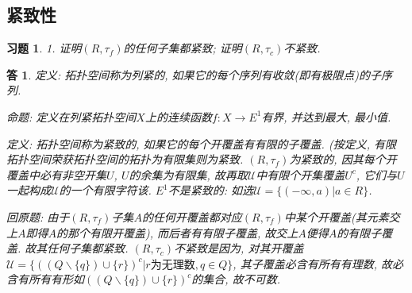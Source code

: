 \documentclass{ctexart}%
\newtheorem*{exercise}{习题}
\newtheorem*{solution}{答}
\theoremstyle{definition}
\theoremstyle{remark}
\begin{document}
\subsection{紧致性}

\begin{exercise}1. 证明$(R,\tau_f)$的任何子集都紧致; 证明$(R,\tau_c)$不紧致.
\end{exercise}
\begin{solution}
定义: 拓扑空间称为列紧的, 如果它的每个序列有收敛(即有极限点)的子序列. 

命题: 定义在列紧拓扑空间$X$上的连续函数$f: X\rightarrow E^1$有界, 并达到最大, 最小值. 

定义: 拓扑空间称为紧致的, 如果它的每个开覆盖有有限的子覆盖. (按定义, 有限拓扑空间荣获拓扑空间的拓扑为有限集则为紧致. $(R,\tau_f)$为紧致的, 因其每个开覆盖中必有非空开集$U$, $U$的余集为有限集, 故再取$\mathscr{U}$中有限个开集覆盖$U^c$, 它们与$U$一起构成$\mathscr{U}$的一个有限字符该. $E^1$不是紧致的: 如选$\mathscr{U}=\{(-\infty,a)|a\in R\}$.

 回原题: 由于$(R, \tau_f)$子集$A$的任何开覆盖都对应$(R,\tau_f)$中某个开覆盖(其元素交上$A$即得$A$的那个有限开覆盖), 而后者有有限子覆盖, 故交上$A$便得$A$的有限子覆盖. 故其任何子集都紧致. $(R,\tau_c)$不紧致是因为, 对其开覆盖$\mathscr{U}=\{((Q\backslash\{q\})\cup\{r\})^c|r\text{为无理数},q\in Q\}$, 其子覆盖必含有所有有理数, 故必含有所有有形如$((Q\backslash\{q\})\cup\{r\})^c$的集合, 故不可数. 
\end{solution}
\end{document}
